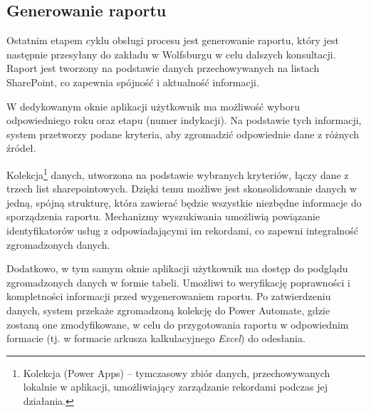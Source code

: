 \subsection{Generowanie raportu}
Ostatnim etapem cyklu obsługi procesu jest generowanie raportu, który jest następnie przesyłany do zakładu w Wolfsburgu w celu dalszych konsultacji. Raport jest tworzony na podstawie danych przechowywanych na listach SharePoint, co zapewnia spójność i aktualność informacji.

W dedykowanym oknie aplikacji użytkownik ma możliwość wyboru odpowiedniego roku oraz etapu (numer indykacji). Na podstawie tych informacji, system przetworzy podane kryteria, aby zgromadzić odpowiednie dane z różnych źródeł.

Kolekcja\footnote{Kolekcja (Power Apps) -- tymczasowy zbiór danych, przechowywanych lokalnie w aplikacji, umożliwiający zarządzanie rekordami podczas jej działania.} danych, utworzona na podstawie wybranych kryteriów, łączy dane z trzech list sharepointowych. Dzięki temu możliwe jest skonsolidowanie danych w jedną, spójną strukturę, która zawierać będzie wszystkie niezbędne informacje do sporządzenia raportu.  Mechanizmy wyszukiwania umożliwią powiązanie identyfikatorów usług z odpowiadającymi im rekordami, co zapewni integralność zgromadzonych danych.

Dodatkowo, w tym samym oknie aplikacji użytkownik ma dostęp do podglądu zgromadzonych danych w formie tabeli. Umożliwi to weryfikację poprawności i kompletności informacji przed wygenerowaniem raportu. Po zatwierdzeniu danych, system przekaże zgromadzoną kolekcję do Power Automate, gdzie zostaną one  zmodyfikowane, w celu do przygotowania raportu w odpowiednim formacie (tj. w formacie arkusza kalkulacyjnego \textit{Excel}) do odesłania.
